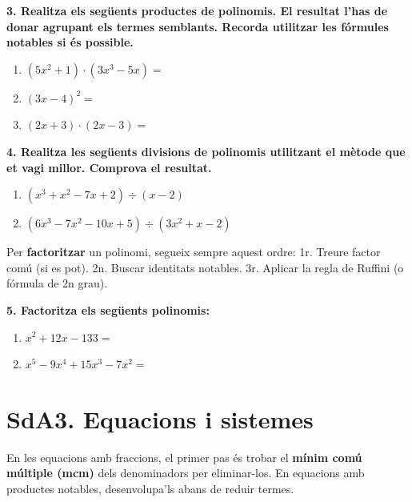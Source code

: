 \documentclass[12pt,a4paper]{article}
\begin{document}
\textbf{3. Realitza els següents productes de polinomis. El resultat l’has de donar agrupant els termes semblants. Recorda utilitzar les fórmules notables si és possible.}
\begin{enumerate}[label=\alph*)]
    \item $(5x^2 + 1) \cdot (3x^3 - 5x) =$ \vspace{1cm}
    \item $(3x - 4)^2 =$ \vspace{0.5cm}
    \item $(2x + 3) \cdot (2x - 3) =$ \vspace{0.5cm}
\end{enumerate}

\textbf{4. Realitza les següents divisions de polinomis utilitzant el mètode que et vagi millor. Comprova el resultat.}
\begin{enumerate}[label=\alph*)]
    \item $(x^3 + x^2 - 7x + 2) \div (x - 2)$ \vspace{2.5cm}
    \item $(6x^3 - 7x^2 - 10x + 5) \div (3x^2 + x - 2)$ \vspace{2.5cm}
\end{enumerate}

\begin{capsula}
Per \textbf{factoritzar} un polinomi, segueix sempre aquest ordre:
1r. Treure factor comú (si es pot).
2n. Buscar identitats notables.
3r. Aplicar la regla de Ruffini (o fórmula de 2n grau).
\end{capsula}

\textbf{5. Factoritza els següents polinomis:}
\begin{enumerate}[label=\alph*)]
    \item $x^2 + 12x - 133 =$ \vspace{2cm}
    \item $x^5 - 9x^4 + 15x^3 - 7x^2 =$ \vspace{2cm}
\end{enumerate}

\newpage
\section*{SdA3. Equacions i sistemes}

\begin{capsula}
En les equacions amb fraccions, el primer pas és trobar el \textbf{mínim comú múltiple (mcm)} dels denominadors per eliminar-los. En equacions amb productes notables, desenvolupa'ls abans de reduir termes.
\end{capsula}
\end{document}
